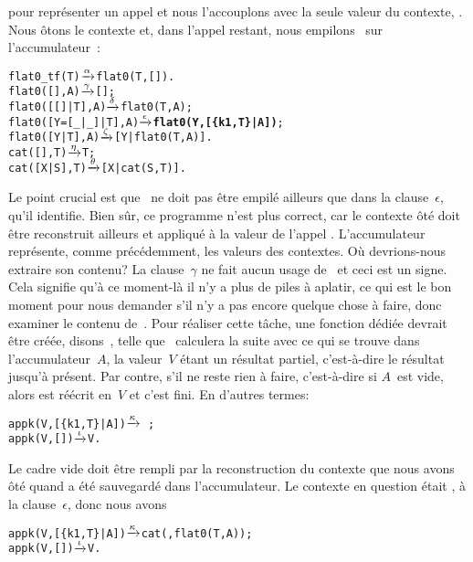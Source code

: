 pour représenter un appel et nous l'accouplons avec la seule valeur du
contexte, . Nous ôtons le contexte
 et, dans l'appel restant,
nous empilons~ sur l'accumulateur~:
\begin{alltt}
flat0\_tf(T)          \(\smashedrightarrow{\alpha}\) flat0(T,[]).
flat0(         [],A) \(\smashedrightarrow{\gamma}\) [];\hfill% A \emph{inutile pour le moment}
flat0(     [[]|T],A) \(\smashedrightarrow{\delta}\) flat0(T,A);
flat0([Y=[\_|\_]|T],A) \(\smashedrightarrow{\epsilon}\) \textbf{flat0(Y,[\{k1,T\}|A])};
flat0(      [Y|T],A) \(\smashedrightarrow{\zeta}\) [Y|flat0(T,A)].
cat(   [],T)         \(\smashedrightarrow{\eta}\) T;
cat([X|S],T)         \(\smashedrightarrow{\theta}\) [X|cat(S,T)].
\end{alltt}
Le point crucial est que ~ne doit pas être empilé ailleurs
que dans la clause~\(\epsilon\), qu'il identifie. Bien sûr, ce
programme n'est plus correct, car le contexte ôté doit être
reconstruit ailleurs et appliqué à la valeur de l'appel
. L'accumulateur~
représente, comme précédemment, les valeurs des contextes. Où
devrions-nous extraire son contenu? La clause~\(\gamma\) ne fait aucun
usage de~ et ceci est un signe. Cela signifie qu'à ce
moment-là il n'y a plus de piles à aplatir, ce qui est le bon moment
pour nous demander s'il n'y a pas encore quelque chose à faire, donc
examiner le contenu de~. Pour réaliser cette tâche, une
fonction dédiée devrait être créée, disons~, telle
que~ calculera la suite avec ce qui se
trouve dans l'accumulateur~\(A\), la valeur~\(V\) étant un résultat
partiel, c'est-à-dire le résultat jusqu'à présent. Par contre, s'il ne
reste rien à faire, c'est-à-dire si \(A\)~est vide, alors
 est réécrit en~\(V\) et c'est fini. En
d'autres termes:
\begin{alltt}
appk(V,[\{k1,T\}|A]) \(\smashedrightarrow{\kappa}\) \,;
appk(V,        []) \(\smashedrightarrow{\iota}\) V.\hfill% \emph{La fin}
\end{alltt}
Le cadre vide doit être rempli par la reconstruction du contexte que nous avons ôté quand  a été sauvegardé dans l'accumulateur. Le contexte en question était
, à la
clause~\(\epsilon\), donc nous avons
\begin{alltt}
appk(V,[\{k1,T\}|A]) \(\smashedrightarrow{\kappa}\) cat(,flat0(T,A));
appk(V,        []) \(\smashedrightarrow{\iota}\) V.
\end{alltt}
